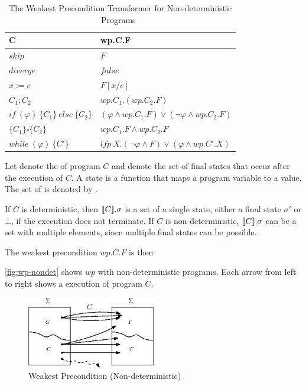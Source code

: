 \begin{table}[ht!]\centering
    \begin{tabular}{ll}
    \hline\hline
      \textbf{C}&\textbf{wp.C.F}    \\ \hline
      $skip$&   $F$   \\
      $diverge$&  $false$\\
      $x:= e $&  $F[x/e]$\\
      $C_1;C_2$&  $wp.C_1.(wp.C_2.F)$\\
      $if\ (\varphi)\ \{C_1\}\ else\ \{C_2\} $&  $(\varphi\wedge wp.C_1.F)\vee(\neg\varphi\wedge wp.C_2.F)$\\
      {\color{Maroon}$\{C_1\}\square \{C_2\}$} & {\color{Maroon}$wp.C_1.F\wedge wp.C_2.F$}\\
      $while\ (\varphi)\ \{C'\}$&  $lfp\ X.(\neg\varphi\wedge F)\vee(\varphi\wedge wp.C'.X)$\\
    \hline\hline
    \end{tabular}
    \caption{The Weakest Precondition Transformer for Non-deterministic Programs~\cite{kaminski19}}
    \label{tab:wp-nondet}
\end{table}

Let  denote the  of program $C$ and  denote the set of final states that  occur after the execution of $C$. 
A state is a function that maps a program variable to a value. The set of  is denoted by . 

If $C$ is deterministic, then $\llbracket {C} \rrbracket.\sigma$ is a set of a single state, either a final state $\sigma'$ or $\bot$, if the execution does not terminate. 
If $C$ is non-deterministic, $\llbracket {C} \rrbracket.\sigma$ can be a set with multiple elements, since multiple final states can be possible. 

The weakest precondition $wp.C.F$ is then 


\autoref{fig:wp-nondet} shows $wp$ with non-deterministic programs. 
Each arrow from left to right shows a  execution of program $C$. 

\begin{figure}[ht!]\centering
\includegraphics[width=0.5\textwidth]{image/wp-nondet.eps}
\caption{Weakest Precondition (Non-deterministic)}
\label{fig:wp-nondet}
\end{figure}








